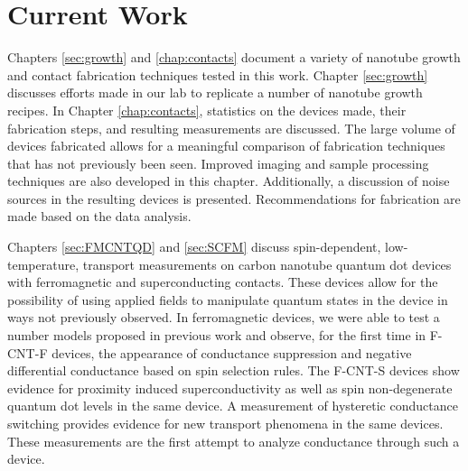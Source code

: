\section{Current Work}

Chapters \ref{sec:growth} and \ref{chap:contacts} document a variety of nanotube growth and contact fabrication techniques tested in this work. Chapter \ref{sec:growth} discusses  efforts made in our lab to replicate a number of nanotube growth recipes. In Chapter \ref{chap:contacts}, statistics on the devices made, their fabrication steps, and resulting measurements are discussed. The large volume of devices fabricated allows for a meaningful comparison of fabrication techniques that has not previously been seen. Improved imaging and sample processing techniques are also developed in this chapter. Additionally, a discussion of noise sources in the resulting devices is presented. Recommendations for fabrication are made based on the data analysis.

Chapters \ref{sec:FMCNTQD} and \ref{sec:SCFM} discuss spin-dependent, low-temperature, transport measurements on carbon nanotube quantum dot devices with ferromagnetic and superconducting contacts. These devices allow for the possibility of using applied fields to manipulate quantum states in the device in ways not previously observed. In ferromagnetic devices, we were able to test a number models proposed in previous work and observe, for the first time in F-CNT-F devices, the appearance of conductance suppression and negative differential conductance based on spin selection rules. The F-CNT-S devices show evidence for proximity induced superconductivity as well as spin non-degenerate quantum dot levels in the same device. A measurement of hysteretic conductance switching provides evidence for new transport phenomena in the same devices. These measurements are the first attempt to analyze conductance through such a device.

